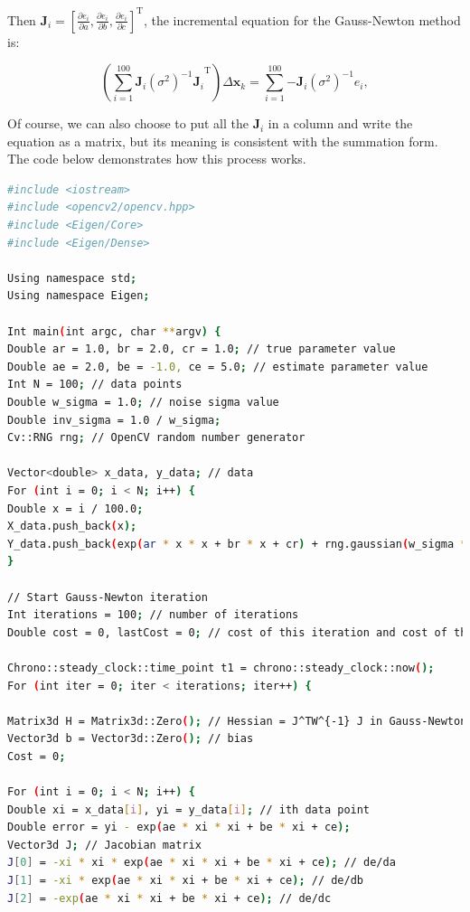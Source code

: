 Then $\bm{J}_i = \left[\frac{{\partial {e_i}}}{{\partial a}},\frac{{\partial {e_i}}}{{\partial b}}, \frac{{\partial {e_i}}}{{\partial c}} \right]^\mathrm{T}$, the incremental equation for the Gauss-Newton method is:

\begin{equation}
\left(\sum\limits_{i = 1}^{100} {\bm{J}_i{(\sigma^2)^{ - 1}}{\bm{J}_i}}^\mathrm{T} \right) \Delta \bm{x}_k = \sum\limits_{i = 1}^{100} { - {\bm{J}_i}{(\sigma^2)^{ - 1}}{e_i}},
\end{equation}

Of course, we can also choose to put all the $\bm{J}_i$ in a column and write the equation as a matrix, but its meaning is consistent with the summation form. The code below demonstrates how this process works.

\begin{lstlisting}[language=sh,caption=slambook2/ch6/gaussNewton.cpp]
#include <iostream>
#include <opencv2/opencv.hpp>
#include <Eigen/Core>
#include <Eigen/Dense>

Using namespace std;
Using namespace Eigen;

Int main(int argc, char **argv) {
Double ar = 1.0, br = 2.0, cr = 1.0; // true parameter value
Double ae = 2.0, be = -1.0, ce = 5.0; // estimate parameter value
Int N = 100; // data points
Double w_sigma = 1.0; // noise sigma value
Double inv_sigma = 1.0 / w_sigma;
Cv::RNG rng; // OpenCV random number generator

Vector<double> x_data, y_data; // data
For (int i = 0; i < N; i++) {
Double x = i / 100.0;
X_data.push_back(x);
Y_data.push_back(exp(ar * x * x + br * x + cr) + rng.gaussian(w_sigma * w_sigma));
}

// Start Gauss-Newton iteration
Int iterations = 100; // number of iterations
Double cost = 0, lastCost = 0; // cost of this iteration and cost of the last iteration

Chrono::steady_clock::time_point t1 = chrono::steady_clock::now();
For (int iter = 0; iter < iterations; iter++) {

Matrix3d H = Matrix3d::Zero(); // Hessian = J^TW^{-1} J in Gauss-Newton
Vector3d b = Vector3d::Zero(); // bias
Cost = 0;

For (int i = 0; i < N; i++) {
Double xi = x_data[i], yi = y_data[i]; // ith data point
Double error = yi - exp(ae * xi * xi + be * xi + ce);
Vector3d J; // Jacobian matrix
J[0] = -xi * xi * exp(ae * xi * xi + be * xi + ce); // de/da
J[1] = -xi * exp(ae * xi * xi + be * xi + ce); // de/db
J[2] = -exp(ae * xi * xi + be * xi + ce); // de/dc


\end{lstlisting}

